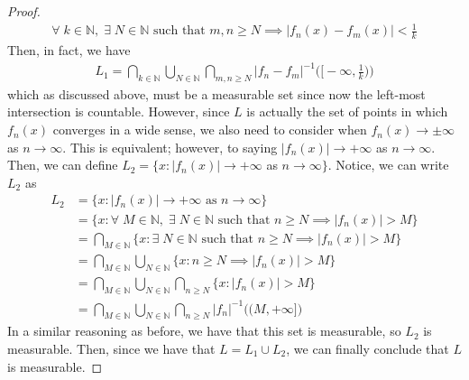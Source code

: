 \documentclass[10pt,a4paper]{article}
\theoremstyle{definition}
\theoremstyle{definition}
\numberwithin{equation}{section}
\begin{document}
\begin{proof}
\begin{align*}
\forall \; k \in \mathbb{N}, \; \exists \; N \in \mathbb{N} \text{ such that } m, n \geq N \implies |f_n(x) - f_m(x)| < \frac{1}{k}
\end{align*}
Then, in fact, we have
\begin{align*}
L_1 = \bigcap_{k \in \mathbb{N}} \bigcup_{N \in \mathbb{N}} \bigcap_{m, n \geq N} |f_n - f_m|^{-1}\bigg(\bigg[-\infty, \frac{1}{k}\bigg) \bigg)
\end{align*}
which as discussed above, must be a measurable set since now the left-most intersection is countable. However, since $L$ is actually the set of points in which $f_n(x)$ converges in a wide sense, we also need to consider when $f_n(x) \to \pm \infty$ as $n \to \infty$. This is equivalent; however, to saying $|f_n(x)| \to +\infty$ as $n \to \infty$. Then, we can define $L_2 = \{x : |f_n(x)| \to +\infty$ as $n \to \infty\}$. Notice, we can write $L_2$ as 
\begin{align*}
L_2 &= \{x : |f_n(x)| \to +\infty \text{ as } n \to \infty\}\\
&= \{x : \forall \; M \in \mathbb{N}, \; \exists \; N \in \mathbb{N} \text{ such that } n \geq N \implies |f_n(x)| > M\}\\
&= \bigcap_{M \in \mathbb{N}} \{x : \exists \; N \in \mathbb{N} \text{ such that } n \geq N \implies |f_n(x)| > M\}\\
&= \bigcap_{M \in \mathbb{N}} \bigcup_{N \in \mathbb{N}} \{x : n \geq N \implies |f_n(x)| > M\}\\
&= \bigcap_{M \in \mathbb{N}} \bigcup_{N \in \mathbb{N}} \bigcap_{n \geq N} \{x : |f_n(x)| > M\}\\
&= \bigcap_{M \in \mathbb{N}} \bigcup_{N \in \mathbb{N}} \bigcap_{n \geq N} |f_n|^{-1}\big((M, +\infty]\big)
\end{align*}
In a similar reasoning as before, we have that this set is measurable, so $L_2$ is measurable. Then, since we have that $L = L_1 \cup L_2$, we can finally conclude that $L$ is measurable. 
\end{proof}
\end{document}
